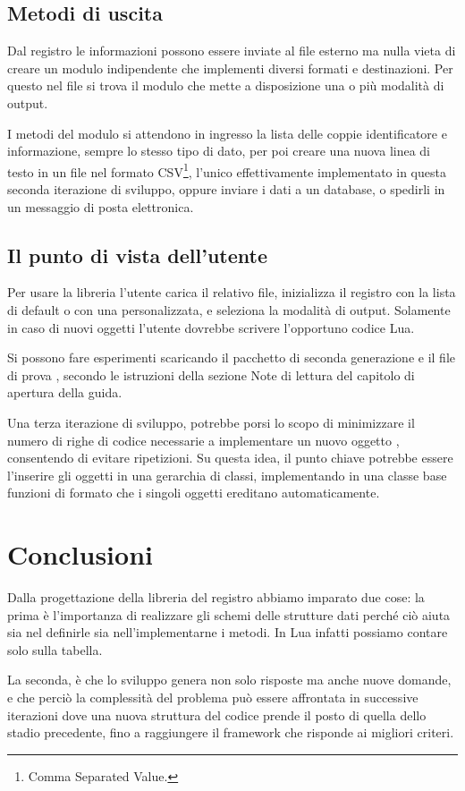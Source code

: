 \subsection{Metodi di uscita}

Dal registro le informazioni possono essere inviate al file esterno ma nulla
vieta di creare un modulo indipendente che implementi diversi formati e
destinazioni. Per questo nel file  si trova il modulo
 che mette a disposizione una o più modalità di output.

I metodi del modulo si attendono in ingresso la lista delle coppie
identificatore e informazione, sempre lo stesso tipo di dato, per poi creare una
nuova linea di testo in un file nel formato CSV\footnote{Comma Separated
Value.}, l'unico effettivamente implementato in questa seconda iterazione di
sviluppo, oppure inviare i dati a un database, o spedirli in un messaggio di
posta elettronica.


\subsection{Il punto di vista dell'utente}

Per usare la libreria l'utente carica il relativo file, inizializza il registro
con la lista di default o con una personalizzata, e seleziona la modalità di
output. Solamente in caso di nuovi oggetti  l'utente dovrebbe scrivere
l'opportuno codice Lua.

Si possono fare esperimenti scaricando il pacchetto di seconda generazione
 e il file di prova , secondo le
istruzioni della sezione Note di lettura del capitolo di apertura della guida.

Una terza iterazione di sviluppo, potrebbe porsi lo scopo di minimizzare il
numero di righe di codice necessarie a implementare un nuovo oggetto ,
consentendo di evitare ripetizioni. Su questa idea, il punto chiave potrebbe
essere l'inserire gli oggetti  in una gerarchia di classi,
implementando in una classe base funzioni di formato che i singoli oggetti
ereditano automaticamente.


\section{Conclusioni}

Dalla progettazione della libreria del registro abbiamo imparato due cose: la
prima è l'importanza di realizzare gli schemi delle strutture dati perché ciò
aiuta sia nel definirle sia nell'implementarne i metodi. In Lua infatti possiamo
contare solo sulla tabella.

La seconda, è che lo sviluppo genera non solo risposte ma anche nuove domande, e
che perciò la complessità del problema può essere affrontata in successive
iterazioni dove una nuova struttura del codice prende il posto di quella dello
stadio precedente, fino a raggiungere il framework che risponde ai migliori
criteri.


